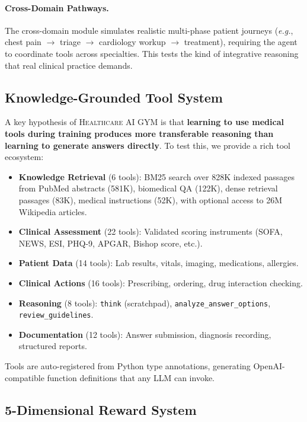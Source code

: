 \documentclass{article}
\newcommand{\gym}{\textsc{Healthcare AI GYM}}
\begin{document}
\paragraph{Cross-Domain Pathways.}
The cross-domain module simulates realistic multi-phase patient journeys (\textit{e.g.}, chest pain $\to$ triage $\to$ cardiology workup $\to$ treatment), requiring the agent to coordinate tools across specialties. This tests the kind of integrative reasoning that real clinical practice demands.

\subsection{Knowledge-Grounded Tool System}
\label{sec:tools}

A key hypothesis of \gym{} is that \textbf{learning to use medical tools during training produces more transferable reasoning than learning to generate answers directly}. To test this, we provide a rich tool ecosystem:

\begin{itemize}[nosep, leftmargin=*]
    \item \textbf{Knowledge Retrieval} (6 tools): BM25 search over 828K indexed passages from PubMed abstracts (581K), biomedical QA (122K), dense retrieval passages (83K), medical instructions (52K), with optional access to 26M Wikipedia articles.
    \item \textbf{Clinical Assessment} (22 tools): Validated scoring instruments (SOFA, NEWS, ESI, PHQ-9, APGAR, Bishop score, etc.).
    \item \textbf{Patient Data} (14 tools): Lab results, vitals, imaging, medications, allergies.
    \item \textbf{Clinical Actions} (16 tools): Prescribing, ordering, drug interaction checking.
    \item \textbf{Reasoning} (8 tools): \texttt{think} (scratchpad), \texttt{analyze\_answer\_options}, \texttt{review\_guidelines}.
    \item \textbf{Documentation} (12 tools): Answer submission, diagnosis recording, structured reports.
\end{itemize}

Tools are auto-registered from Python type annotations, generating OpenAI-compatible function definitions that any LLM can invoke.

\subsection{5-Dimensional Reward System}
\label{sec:reward}
\end{document}
